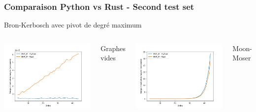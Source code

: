 \documentclass{beamer}
\begin{document}
\begin{frame}
\frametitle{Comparaison Python vs Rust - Second test set}
Bron-Kerbosch avec pivot de degré maximum
  \begin{columns}
    \centering
    \includegraphics[width=\textwidth]{images/total_BKP_M_new_pyrust_pivot_empty_plot.png}
    \caption{Graphes vides}
    \centering
    \includegraphics[width=\textwidth]{images/total_BKP_M_new_pyrust_pivot_turan_plot.png}
    \caption{Moon-Moser}
    \centering

\end{columns}
\end{frame}
\end{document}
